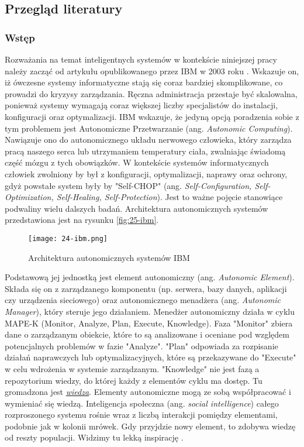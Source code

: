 \subsection{Przegląd literatury}
\subsubsection{Wstęp}
Rozważania na temat inteligentnych systemów w kontekście niniejszej pracy należy zacząć od artykułu opublikowanego przez IBM w 2003 roku \cite{kephart2003}. Wskazuje on, iż ówczesne systemy informatyczne stają się coraz bardziej skomplikowane, co prowadzi do kryzysy zarządzania. Ręczna administracja przestaje być skalowalna, ponieważ systemy wymagają coraz większej liczby specjalistów do instalacji, konfiguracji oraz optymalizacji. IBM wskazuje, że jedyną opcją poradzenia sobie z tym problemem jest Autonomiczne Przetwarzanie (ang. \textit{Autonomic Computing}). Nawiązuje ono do autonomicznego układu nerwowego człowieka, który zarządza pracą naszego serca lub utrzymaniem temperatury ciała, zwalniając świadomą część mózgu z tych obowiązków. W kontekście systemów informatycznych człowiek zwolniony by był z konfiguracji, optymalizacji, naprawy oraz ochrony, gdyż powstałe system były by "Self-CHOP" (ang. \textit{Self-Configuration, Self-Optimization, Self-Healing, Self-Protection}). Jest to ważne pojęcie stanowiące podwaliny wielu dalszych badań. Architektura autonomicznych systemów przedstawiona jest na rysunku \ref{fig:25-ibm}.

\begin{figure}[!htbp]
    \centering \texttt{[image: 24-ibm.png]}
    \caption{Architektura autonomicznych systemów IBM}\label{fig:24-ibm}
\end{figure}

Podstawową jej jednostką jest element autonomiczny (ang. \textit{Autonomic Element}). Składa się on z zarządzanego komponentu (np. serwera, bazy danych, aplikacji czy urządzenia sieciowego) oraz autonomicznego menadżera (ang. \textit{Autonomic Manager}), który steruje jego działaniem. Menedżer autonomiczny działa w cyklu MAPE-K (Monitor, Analyze, Plan, Execute, Knowledge). Faza "Monitor" zbiera dane o zarządzanym obiekcie, które to są analizowane i oceniane pod względem potencjalnych problemów w fazie "Analyze". "Plan" odpowiada za rozpisanie działań naprawczych lub optymalizacyjnych, które są przekazywane do "Execute" w celu wdrożenia w systemie zarządzanym. "Knowledge" nie jest fazą a repozytorium wiedzy, do której każdy z elementów cyklu ma dostęp. Tu gromadzona jest \hyperlink{def:wiedza}{\textit{wiedza}}. Elementy autonomiczne mogą ze sobą współpracować i wymieniać się wiedzą. Inteligencja społeczna (ang. \textit{social intelligence}) całego rozproszonego systemu rośnie wraz z liczbą interakcji pomiędzy elementami, podobnie jak w kolonii mrówek. Gdy przyjdzie nowy element, to zdobywa wiedzę od reszty populacji. Widzimy tu lekką inspirację \cite{minsky1986}.

